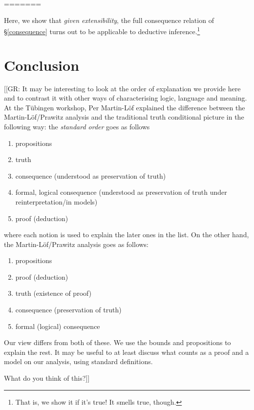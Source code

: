 \documentclass{article}
\begin{document}
=======

Here, we show that {\em given extensibility}, the full consequence relation of \S\ref{consequence} turns out to be applicable to deductive inference.\footnote{That is, we show it if it's true! It smells true, though.}



\section{Conclusion}

[[GR: It may be interesting to look at the order of explanation we provide here and to contrast it with other ways of characterising logic, language and meaning. At the T\"ubingen workshop, Per Martin-L\"of explained the difference between the Martin-L\"of/Prawitz analysis and the traditional truth conditional picture in the following way: the \emph{standard order} goes as follows
\begin{enumerate}
\item propositions
\item truth
\item consequence (understood as preservation of truth)
\item formal, logical consequence (understood as preservation of truth under reinterpretation/in models)
\item proof (deduction)
\end{enumerate}
where each notion is used to explain the later ones in the list.
On the other hand, the Martin-L\"of/Prawitz analysis goes as follows:
\begin{enumerate}
\item propositions
\item proof (deduction)
\item truth (existence of proof)
\item consequence (preservation of truth)
\item formal (logical) consequence
\end{enumerate}
Our view differs from both of these. We use the bounds and propositions to explain the rest.  It may be useful to at least discuss what counts as a proof and a model on our analysis, using standard definitions.

What do you think of this?]]



\end{document}
